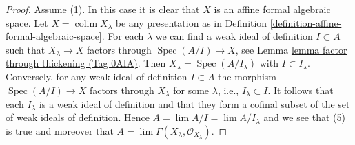 \documentclass{amsart}
\theoremstyle{plain}
\theoremstyle{definition}
\theoremstyle{remark}
\numberwithin{equation}{subsection}
\def\lim{\mathop{\mathrm{lim}}\nolimits}
\def\colim{\mathop{\mathrm{colim}}\nolimits}
\def\Spec{\mathop{\mathrm{Spec}}}
\begin{document}
\begin{proof}
\medskip\noindent
Assume (1). In this case it is clear that $X$ is an affine formal
algebraic space. Let $X = \colim X_\lambda$ be any presentation as in
Definition \ref{definition-affine-formal-algebraic-space}.
For each $\lambda$ we can find a weak ideal of definition
$I \subset A$ such that $X_\lambda \to X$ factors through
$\Spec(A/I) \to X$, see Lemma \href{https://stacks.math.columbia.edu/tag/0AIA}{lemma factor through thickening (Tag 0AIA)}.
Then $X_\lambda = \Spec(A/I_\lambda)$ with $I \subset I_\lambda$.
Conversely, for any weak ideal of definition $I \subset A$
the morphism $\Spec(A/I) \to X$ factors through $X_\lambda$
for some $\lambda$, i.e., $I_\lambda \subset I$.
It follows that each $I_\lambda$ is a weak ideal of definition
and that they form a cofinal subset of the set of weak ideals
of definition. Hence $A = \lim A/I = \lim A/I_\lambda$
and we see that (5) is true and moreover that
$A = \lim \Gamma(X_\lambda, \mathcal{O}_{X_\lambda})$.
\end{proof}
\end{document}

